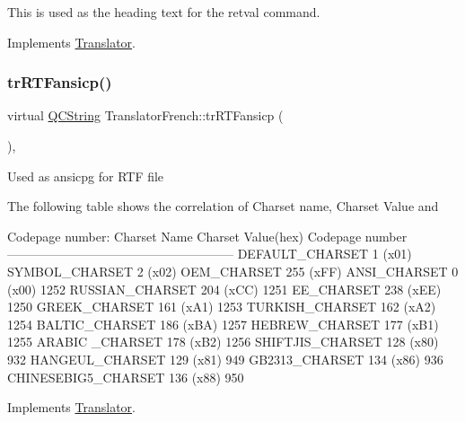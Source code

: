 This is used as the heading text for the retval command. 

Implements \mbox{\hyperlink{class_translator}{Translator}}.

\mbox{\label{class_translator_french_abfc38820bc57b6179750e68567150441}} 
\subsubsection{\texorpdfstring{trRTFansicp()}{trRTFansicp()}}
{\footnotesize\ttfamily virtual \mbox{\hyperlink{class_q_c_string}{Q\+C\+String}} Translator\+French\+::tr\+R\+T\+Fansicp (\begin{DoxyParamCaption}{ }\end{DoxyParamCaption})\hspace{0.3cm}{\ttfamily [inline]}, {\ttfamily [virtual]}}

Used as ansicpg for R\+TF file

The following table shows the correlation of Charset name, Charset Value and 
\begin{DoxyPre}
Codepage number:
Charset Name       Charset Value(hex)  Codepage number
------------------------------------------------------
DEFAULT\_CHARSET           1 (x01)
SYMBOL\_CHARSET            2 (x02)
OEM\_CHARSET             255 (xFF)
ANSI\_CHARSET              0 (x00)            1252
RUSSIAN\_CHARSET         204 (xCC)            1251
EE\_CHARSET              238 (xEE)            1250
GREEK\_CHARSET           161 (xA1)            1253
TURKISH\_CHARSET         162 (xA2)            1254
BALTIC\_CHARSET          186 (xBA)            1257
HEBREW\_CHARSET          177 (xB1)            1255
ARABIC \_CHARSET         178 (xB2)            1256
SHIFTJIS\_CHARSET        128 (x80)             932
HANGEUL\_CHARSET         129 (x81)             949
GB2313\_CHARSET          134 (x86)             936
CHINESEBIG5\_CHARSET     136 (x88)             950
\end{DoxyPre}
 

Implements \mbox{\hyperlink{class_translator_a9953a4c0e6a4fc7d017abcd5c2939e0f}{Translator}}.

\mbox{\label{class_translator_french_a52bff13cf3978da0cda611cd29578f03}} 

